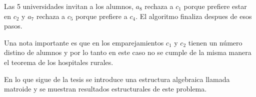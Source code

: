 \begin{eje}
\begin{figure}[H]
\end{figure}

Las 5 universidades invitan a los alumnos, $a_8$ rechaza a $c_1$ porque prefiere estar en $c_2$ y $a_7$ rechaza a $c_5$ porque prefiere a $c_4$. El algoritmo finaliza despues de esos pasos.

\fin

\end{eje}

Una nota importante es que en los emparejamientos $c_1$ y $c_2$ tienen un número distino de alumnos y por lo tanto en este caso no se cumple de la misma manera el teorema de los hospitales rurales. 

En lo que sigue de la tesis se introduce una estructura algebraica llamada matroide y se muestran resultados estructurales de este problema.


